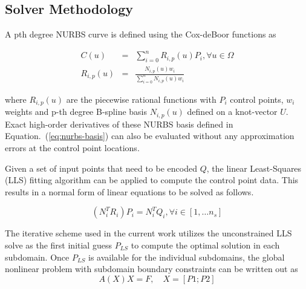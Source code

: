 \documentclass[conference]{IEEEtran}
\newcommand{\eqt}[1]{Equation.~(\ref{#1})}
\begin{document}

\subsection{Solver Methodology}
\label{sec:solver-methodology}

A pth degree NURBS curve \cite{nurbs-book} is defined using the Cox-deBoor functions as

\begin{eqnarray}
C(u) &=& \sum_{i=0}^{n} R_{i,p}(u) P_i, \forall u \in \Omega \\
R_{i,p}(u) &=& \frac{N_{i,p}(u) w_i}{\sum_{i=0}^{n} N_{i,p}(u) w_i}
\label{eq:nurbs-basis}
\end{eqnarray}

where $R_{i,p}(u)$ are the piecewise rational functions with $P_i$ control points, $w_i$ weights and p-th degree B-spline basis $N_{i,p}(u)$ defined on a knot-vector $U$. Exact high-order derivatives of these NURBS basis defined in \eqt{eq:nurbs-basis} can also be evaluated without any approximation errors at the control point locations.

Given a set of input points that need to be encoded $Q$, the linear Least-Squares (LLS) fitting algorithm can be applied to compute the control point data. This results in a normal form of linear equations to be solved as follows.

\begin{equation}
(N_i^T R_i) P_i = N_i^T Q_i, \forall i \in [1, \ldots n_s]
\label{eq:LSQ-system}
\end{equation}

The iterative scheme used in the current work utilizes the unconstrained LLS solve as the first initial guess $P_{LS}$ to compute the optimal solution in each subdomain. Once $P_{LS}$ is available for the individual subdomains, the global nonlinear problem with subdomain boundary constraints can be written out as
%
\begin{equation}
A(X) X = F, \quad X = \left[P1 ; P2 \right]
\label{eq:global-system}
\end{equation}
\end{document}
